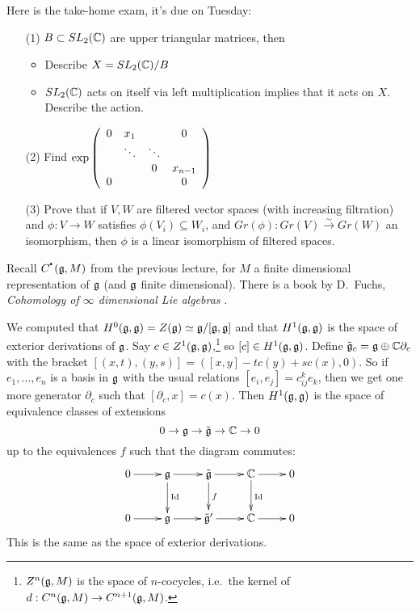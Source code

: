  \setcounter{lecture}{10}

 Here is the take-home exam, it's due on Tuesday:

 \begin{itemize}
 \item[(1)] $B\subset SL_{2}(\mathbb{C})$ are upper triangular matrices, then

 \begin{itemize}
 \item Describe $X=SL_{2}(\mathbb{C})/B$

 \item $SL_{2}(\mathbb{C})$ acts on itself via left multiplication implies that it acts on
 $X$. Describe the action.
 \end{itemize}

 \item[(2)] Find $\exp\left(
 \begin{array}
 [c]{cccc}%
 0 & x_{1} &  & 0\\
 & \ddots & \ddots & \\
 &  & 0 & x_{n-1}\\
 0 &  &  & 0
 \end{array}
 \right)  $

 \item[(3)] Prove that if $V,W$ are filtered vector spaces (with increasing filtration)
 and $\phi:V\to W$ satisfies $\phi(V_{i})\subseteq W_{i}$, and
 $Gr(\phi):Gr(V)\xrightarrow{\sim} Gr(W)$ an isomorphism, then $\phi$ is a linear
 isomorphism of filtered spaces.
 \end{itemize}


 Recall $C^{\udot}(\g,M)$ from the previous lecture, for $M$ a finite dimensional
 representation of $\mathfrak{g}$ (and $\mathfrak{g}$ finite dimensional). There is a book by D.~Fuchs,
 \textsl{Cohomology of $\infty$ dimensional Lie algebras} \cite{Fuchs}.

 We computed that $H^{0}(\mathfrak{g},\mathfrak{g})=Z(\mathfrak{g})\simeq\mathfrak{g}/[\mathfrak{g},\mathfrak{g}]$ and that $H^{1}(\mathfrak{g},\mathfrak{g})$ is the
 space of exterior derivations of $\mathfrak{g}$. Say $c\in Z^{1}(\mathfrak{g},\mathfrak{g})$,\footnote{$Z^n(\mathfrak{g},M)$
 is the space of $n$-cocycles, i.e.\ the kernel of $d:C^n(\mathfrak{g},M)\to C^{n+1}(\mathfrak{g},M)$.} so
 $[c]\in H^{1}(\mathfrak{g},\mathfrak{g})$. Define $\tilde{\mathfrak{g}}_{c}=\mathfrak{g}\oplus\mathbb{C}\partial_{c}$ with the bracket
 $[(x,t),(y,s)]=([x,y]-tc(y)+sc(x),0)$. So if $e_{1},\dots,e_{n}$ is a basis in $\mathfrak{g}$
 with the usual relations $[e_{i},e_{j}]=c_{ij}^{k}e_{k}$, then we get one more
 generator $\partial_{c}$ such that $[\partial _{c},x]=c(x)$. Then $H^{1}(\mathfrak{g},\mathfrak{g})$ is
 the space of equivalence classes of extensions
 \[
 0\rightarrow\mathfrak{g}\rightarrow\tilde{\mathfrak{g}}\rightarrow\mathbb{C}\rightarrow0
 \]
 up to the equivalences $f$ such that the diagram commutes:
 \[
 \xymatrix{
 0 \ar[r] &\g \ar[r]\ar[d]^\id & \tilde \g \ar[r] \ar[d]^f & \CC \ar[d]^\id \ar[r] & 0\\
 0 \ar[r] &\g \ar[r] & \tilde\g' \ar[r] & \CC \ar[r] & 0\\
 }
 \]
 This is the same as the space of exterior derivations.

